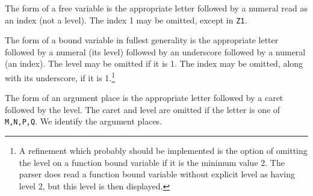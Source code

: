\documentclass{article}
\begin{document}
{{

The form of a free variable is the appropriate letter followed by a numeral read as an index (not a level).  The index 1 may be omitted, except
in {\tt Z1}.

The form of a bound variable in fullest generality is the appropriate letter followed by a numeral (its level) followed by an underscore followed by a numeral (an index).  The level  may be omitted if it is 1.  The index may be omitted, along with its underscore, if it is 1.\footnote{A refinement which probably should be implemented is the option of omitting the level on a function bound variable if it is the minimum value 2.  The parser does read a function bound variable without explicit level as having level 2, but this level is then displayed.}

The form of an argument place is the appropriate letter followed by a caret followed by the level.  The caret and level are omitted if the letter is one of
{\tt M,N,P,Q}.  We identify the argument places.

}}
\end{document}
